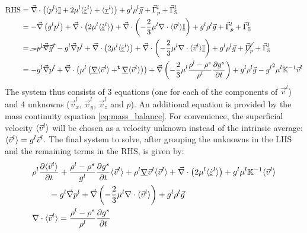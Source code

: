 \begin{subequations}
\begin{align}
\label{eq:momentum_liq_RHS}
	\text{RHS} 
	&=
	 \vec{\nabla} \cdot \left( \langle p^l \rangle \underline{\mathbb{I}} + 2\mu^{l} \langle {\dot{\ensuremath{\underline{\varepsilon}}}}^l \rangle + \langle \underline{\tau}^l \rangle \right) 
	 + {g^l} \rho^l \vec{g} 
	 + \vec{\Gamma}_{p}^{l} + \vec{\Gamma}_{\mathbb{S}}^{l}	 \\
	&=  -\vec{\nabla} \left( g^l p^l \right) 
		+ \vec{\nabla} \cdot \left(  2 \mu^l \langle {\dot{\ensuremath{\underline{\varepsilon}}}}^l \rangle  \right)
		+ \vec{\nabla} \cdot \left( -\frac{2}{3} \mu^l \nabla \cdot \langle \vec{v}^l \rangle \underline{\mathbb{I}} \right)
		+ {g^l} \rho^l \vec{g} 
	 	+ \vec{\Gamma}_{p}^{l} + \vec{\Gamma}_{\mathbb{S}}^{l}	 \\
	&=  \cancel{- p^l \vec{\nabla} {g^l}} - {g^l} \vec{\nabla} p^l
		+ \vec{\nabla} \cdot \left(  2 \mu^l \langle {\dot{\ensuremath{\underline{\varepsilon}}}}^l \rangle  \right)
		+ \vec{\nabla} \cdot \left( -\frac{2}{3} \mu^l \nabla \cdot \langle \vec{v}^l \rangle \underline{\mathbb{I}} \right)
		+ g^l \rho^l \vec{g} 
	 	+ \cancel{\vec{\Gamma}_{p}^{l}} + \vec{\Gamma}_{\mathbb{S}}^{l}	 \\
	&=   - g^l \vec{\nabla} p^l
		+ \vec{\nabla} \cdot \left(  \mu^l \left( \underline{\nabla} \langle \vec{v}^l \rangle + ^\text{\textbf{t}} \underline{\nabla} \langle \vec{v}^l \rangle  \right) \right)
		+ \vec{\nabla} \left( -\frac{2}{3} \mu^l \frac{\rho^l-\rho^s}{\rho^l} \frac{\partial  g^s }{\partial t}  \right)
		+ g^l \rho^l \vec{g} 
	 	- {g^l}^{2} \mu^l \mathbb{K}^{-1} \vec{v}^{l}
\end{align}
\end{subequations}
The system thus consists of 3 equations (one for each of the components of $\vec{v}^l$) and 4 unknowns ($\vec{v}^l_x$, $\vec{v}^l_y$, $\vec{v}^l_z$ and $p$). An additional equation is provided by the mass continuity equation \eqref{eq:mass_balance}. For convenience, the superficial velocity $\langle \vec{v}^l \rangle$ will be chosen as a velocity unknown instead of the intrinsic average: $\langle \vec{v}^l \rangle = g^l \vec{v}^l$. The final system to 
solve, after grouping the unknowns in the LHS and the remaining terms in the RHS, is given by:
\label{eq:momentum_liq_final}
\begin{align} %
& \rho^l \frac{\partial \vit}{\partial t}
	 + \frac{ \rhol - \rhos }{g^l}\frac{\partial  \gs }{\partial t} \vit
	 + \rhol  \nabmat \vl \vit
	 + \nabvec \cdot \brac{2 \mu^l \strainrate}
	 + g^l \mu^l  \mathbb{K}^{-1} \vit  \\
	 &\qquad  = g^l \nabvec p^l
	 + \nabvec \brac{-\frac{2}{3} \mu^l \nabla \cdot \avg{\vec{v}^l}  }
	 +  g^l \rho^l \vec{g}  \\
&\nabla \cdot \vit= \frac{\rho^l-\rho^s}{\rho^l} \frac{\partial  g^s }{\partial t}
\end{align} %

